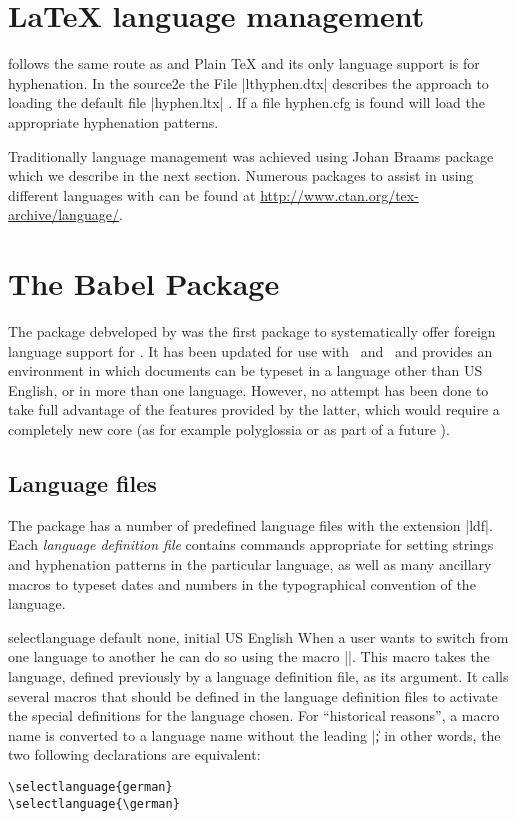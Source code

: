 \section{LaTeX language management}

\latexe follows the same route as \tex and Plain TeX and its only language support is for hyphenation.
In the source2e the File |lthyphen.dtx| describes the approach to loading the default file |hyphen.ltx| . If a file hyphen.cfg is found \latexe will load the appropriate hyphenation patterns. 

Traditionally language management was achieved using Johan 
Braams package  which we describe in the next section. Numerous packages to assist in using different languages with \latex can be found at \url{http://www.ctan.org/tex-archive/language/}. 

\section{The Babel Package} 

The package  debveloped by \citet{babel} was the first package to systematically offer foreign language
support for \latex. It has been updated for use with \XeTeX\ and \LuaTeX\ and provides an environment
in which documents can be typeset in a language
other than US English, or in more than one language.
However, no attempt has been done to
take full advantage of the features provided by the
latter, which would require a completely new core
(as for example polyglossia or as part of a future ).

\subsection{Language files}
The package has a number of predefined language files with the extension |ldf|. Each \emph{language definition file} contains commands appropriate for setting strings and hyphenation patterns in the particular language, as well as
many ancillary macros to typeset dates and numbers in the typographical convention of the language. 


\begin{docCommand} {selectlanguage} {} {default none, initial US English}
When a user wants to switch from one language to another he can
do so using the macro |\selectlanguage|. This macro takes the
language, defined previously by a language definition file, as
its argument. It calls several macros that should be defined in
the language definition files to activate the special definitions
for the language chosen. For ``historical reasons'', a macro name is
converted to a language name without the leading |\|; in other words,
the two following declarations are equivalent:
\end{docCommand}
\begin{verbatim}
\selectlanguage{german}
\selectlanguage{\german}
\end{verbatim}

